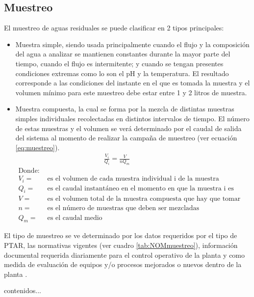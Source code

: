 \subsection{Muestreo}
El muestreo de aguas residuales se puede clasificar en 2 tipos principales:
\begin{itemize}
	\item Muestra simple, siendo usada principalmente cuando el flujo y la composición del agua a analizar se mantienen constantes durante la mayor parte del tiempo, cuando el flujo es intermitente; y cuando se tengan presentes condiciones extremas como lo son el \acrshort{pH} y la temperatura. El resultado corresponde a las condiciones del instante en el que es tomada la muestra y el volumen mínimo para este muestreo debe estar entre 1 y 2 litros de muestra.
	\item Muestra compuesta, la cual se forma por la mezcla de distintas muestras simples individuales recolectadas en distintos intervalos de tiempo. El número de estas muestras y el volumen se verá determinado por el caudal de salida del sistema al momento de realizar la campaña de muestreo (ver ecuación \ref{eq:muestreo}).
	\begin{equation} \label{eq:muestreo}
	\begin{split}
		&\;\qquad\qquad\qquad\qquad\;\frac{V_{i}}{Q_{i}} = \frac{V}{nQ_{m}}\\
		\text{Donde:} \\
			V_{i} =& \text{ es el volumen de cada muestra individual i de la muestra compuesta}\\
			Q_{i} =& \text{ es el  caudal instantáneo en el momento en que la muestra i es tomada}\\
			V =& \text{ es el volumen total de la muestra compuesta que hay que tomar}\\
			n =& \text{ es el número de muestras  que deben ser	mezcladas}\\
			Q_{m} =& \text{ es el caudal medio}
	\end{split}
	\end{equation}
\end{itemize}
El tipo de muestreo se ve determinado por los datos requeridos por el tipo de PTAR, las normativas vigentes (ver cuadro \ref{tab:NOMmuestreo}), información documental requerida diariamente para el control operativo de la planta y como medida de evaluación de equipos y/o procesos mejorados o nuevos dentro de la planta \citep{metcalf2003,Ramalho2003}.\par
\begin{table}[H]
	contenidos...
	\label{tab:NOMmuestreo}
\end{table}
